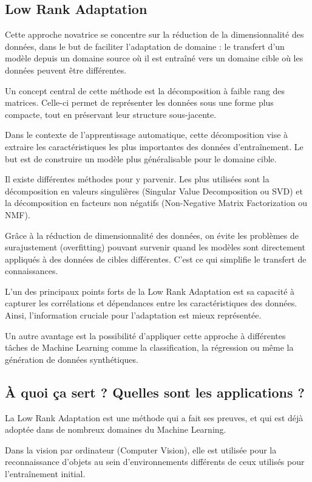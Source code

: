 \subsection{Low Rank Adaptation}
Cette approche novatrice se concentre sur la réduction de la dimensionnalité des
données, dans le but de faciliter l’adaptation de domaine : le transfert d’un modèle
depuis un domaine source où il est entraîné vers un domaine cible où les données
peuvent être différentes.

Un concept central de cette méthode est la décomposition à faible rang des matrices.
Celle-ci permet de représenter les données sous une forme plus compacte, tout en
préservant leur structure sous-jacente.

Dans le contexte de l’apprentissage automatique, cette décomposition vise à
extraire les caractéristiques les plus importantes des données d’entraînement. Le
but est de construire un modèle plus généralisable pour le domaine cible.

Il existe différentes méthodes pour y parvenir. Les plus utilisées sont la
décomposition en valeurs singulières (Singular Value Decomposition ou SVD) et la
décomposition en facteurs non négatifs (Non-Negative Matrix Factorization ou NMF).

Grâce à la réduction de dimensionnalité des données, on évite les problèmes de surajustement
(overfitting) pouvant survenir quand les modèles sont directement appliqués à des
données de cibles différentes. C’est ce qui simplifie le transfert de
connaissances.

L’un des principaux points forts de la Low Rank Adaptation est sa capacité à
capturer les corrélations et dépendances entre les caractéristiques des données.
Ainsi, l’information cruciale pour l’adaptation est mieux représentée.

Un autre avantage est la possibilité d’appliquer cette approche à différentes
tâches de Machine Learning comme la classification, la régression ou même la génération
de données synthétiques.

\subsection*{À quoi ça sert ? Quelles sont les applications ?}
La Low Rank Adaptation est une méthode qui a fait ses preuves, et qui est déjà
adoptée dans de nombreux domaines du Machine Learning.

Dans la vision par ordinateur (Computer Vision), elle est utilisée pour la reconnaissance
d’objets au sein d’environnements différents de ceux utilisés pour l’entraînement
initial.


